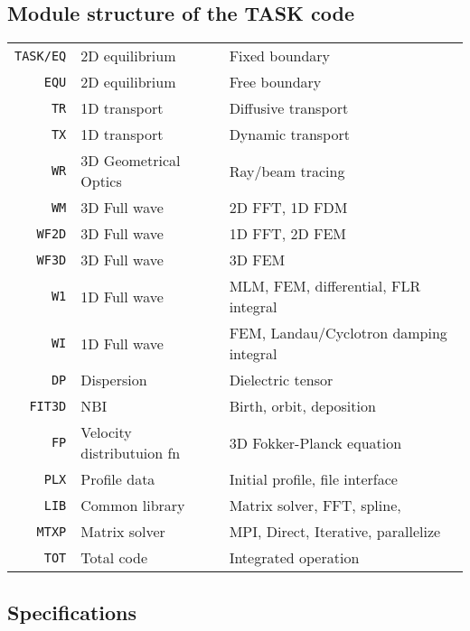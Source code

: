 \documentclass[11pt]{article}
\begin{document}
\subsection{Module structure of the TASK code}
\begin{center}
\begin{tabular}{r|ll}
\hline
\texttt{TASK/EQ} & {2D equilibrium} & Fixed boundary \\
\texttt{EQU} & {2D equilibrium} & Free boundary \\[2mm]
\texttt{TR} & {1D transport} & Diffusive transport \\
\texttt{TX} & {1D transport} & Dynamic transport \\[2mm]
\texttt{WR} & {3D Geometrical Optics} & Ray/beam tracing \\
\texttt{WM} & {3D Full wave} & 2D FFT, 1D FDM \\
\texttt{WF2D} & {3D Full wave} & 1D FFT, 2D FEM \\
\texttt{WF3D} & {3D Full wave} & 3D FEM \\
\texttt{W1} & {1D Full wave} & MLM, FEM, differential, FLR integral \\
\texttt{WI} & {1D Full wave} & FEM, Landau/Cyclotron damping integral \\
\texttt{DP} & {Dispersion} & Dielectric tensor \\[2mm]
\texttt{FIT3D} & {NBI} & Birth, orbit, deposition \\[2mm]
\texttt{FP} & {Velocity distributuion fn} & 3D Fokker-Planck equation \\[2mm]
\texttt{PLX} & {Profile data} & Initial profile, file interface \\
\texttt{LIB} & {Common library} & Matrix solver, FFT, spline,  \\
\texttt{MTXP} & {Matrix solver} & MPI, Direct, Iterative, parallelize \\
\texttt{TOT} & {Total code} & Integrated operation \\
\hline
\end{tabular}
\end{center}

\subsection{Specifications}
\end{document}

